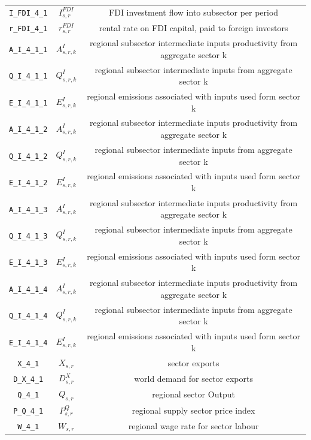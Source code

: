 \begin{center}
\begin{longtable}{ccc}
\texttt{I\_FDI\_4\_1} & ${I^{FDI}_{s,r}}$ & FDI investment flow into subsector per period\\
\texttt{r\_FDI\_4\_1} & ${r^{FDI}_{s,r}}$ & rental rate on FDI capital, paid to foreign investors\\
\texttt{A\_I\_4\_1\_1} & ${A^{I}_{s,r,k}}$ & regional subsector intermediate inputs productivity from aggregate sector k\\
\texttt{Q\_I\_4\_1\_1} & ${Q^{I}_{s,r,k}}$ & regional subsector intermediate inputs from aggregate sector k\\
\texttt{E\_I\_4\_1\_1} & ${E^I_{s,r,k}}$ & regional emissions associated with inputs used form sector k\\
\texttt{A\_I\_4\_1\_2} & ${A^{I}_{s,r,k}}$ & regional subsector intermediate inputs productivity from aggregate sector k\\
\texttt{Q\_I\_4\_1\_2} & ${Q^{I}_{s,r,k}}$ & regional subsector intermediate inputs from aggregate sector k\\
\texttt{E\_I\_4\_1\_2} & ${E^I_{s,r,k}}$ & regional emissions associated with inputs used form sector k\\
\texttt{A\_I\_4\_1\_3} & ${A^{I}_{s,r,k}}$ & regional subsector intermediate inputs productivity from aggregate sector k\\
\texttt{Q\_I\_4\_1\_3} & ${Q^{I}_{s,r,k}}$ & regional subsector intermediate inputs from aggregate sector k\\
\texttt{E\_I\_4\_1\_3} & ${E^I_{s,r,k}}$ & regional emissions associated with inputs used form sector k\\
\texttt{A\_I\_4\_1\_4} & ${A^{I}_{s,r,k}}$ & regional subsector intermediate inputs productivity from aggregate sector k\\
\texttt{Q\_I\_4\_1\_4} & ${Q^{I}_{s,r,k}}$ & regional subsector intermediate inputs from aggregate sector k\\
\texttt{E\_I\_4\_1\_4} & ${E^I_{s,r,k}}$ & regional emissions associated with inputs used form sector k\\
\texttt{X\_4\_1} & ${X_{s,r}}$ & sector exports\\
\texttt{D\_X\_4\_1} & ${D^{X}_{s,r}}$ & world demand for sector exports\\
\texttt{Q\_4\_1} & ${Q_{s,r}}$ & regional sector Output\\
\texttt{P\_Q\_4\_1} & ${P^Q_{s,r}}$ & regional supply sector price index\\
\texttt{W\_4\_1} & ${W_{s,r}}$ & regional wage rate for sector labour\\

\end{longtable}
\end{center}
